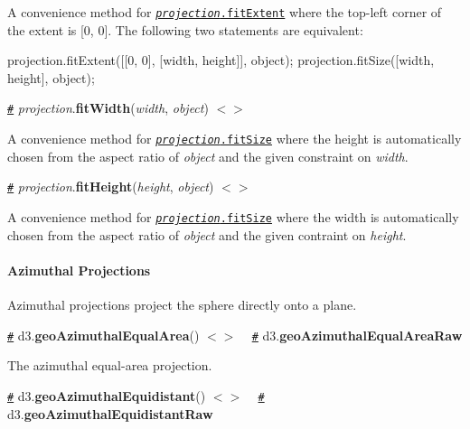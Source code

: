 A convenience method for \href{#projection_fitExtent}{\tt {\itshape projection}.fit\+Extent} where the top-\/left corner of the extent is \mbox{[}0, 0\mbox{]}. The following two statements are equivalent\+:


\begin{DoxyCode}
projection.fitExtent([[0, 0], [width, height]], object);
projection.fitSize([width, height], object);
\end{DoxyCode}


\href{#projection_fitWidth}{\tt \#} {\itshape projection}.{\bfseries fit\+Width}({\itshape width}, {\itshape object}) \href{https://github.com/d3/d3-geo/blob/master/src/projection/index.js#L105}{\tt $<$$>$}

A convenience method for \href{#projection_fitSize}{\tt {\itshape projection}.fit\+Size} where the height is automatically chosen from the aspect ratio of {\itshape object} and the given constraint on {\itshape width}.

\href{#projection_fitHeight}{\tt \#} {\itshape projection}.{\bfseries fit\+Height}({\itshape height}, {\itshape object}) \href{https://github.com/d3/d3-geo/blob/master/src/projection/index.js#L109}{\tt $<$$>$}

A convenience method for \href{#projection_fitSize}{\tt {\itshape projection}.fit\+Size} where the width is automatically chosen from the aspect ratio of {\itshape object} and the given contraint on {\itshape height}.

\paragraph*{Azimuthal Projections}

Azimuthal projections project the sphere directly onto a plane.

\href{#geoAzimuthalEqualArea}{\tt \#} d3.{\bfseries geo\+Azimuthal\+Equal\+Area}() \href{https://github.com/d3/d3-geo/blob/master/src/projection/azimuthalEqualArea.js}{\tt $<$$>$} ~\newline
\href{#geoAzimuthalEqualAreaRaw}{\tt \#} d3.{\bfseries geo\+Azimuthal\+Equal\+Area\+Raw}

\href{https://bl.ocks.org/mbostock/3757101}{\tt }

The azimuthal equal-\/area projection.

\href{#geoAzimuthalEquidistant}{\tt \#} d3.{\bfseries geo\+Azimuthal\+Equidistant}() \href{https://github.com/d3/d3-geo/blob/master/src/projection/azimuthalEquidistant.js}{\tt $<$$>$} ~\newline
\href{#geoAzimuthalEquidistantRaw}{\tt \#} d3.{\bfseries geo\+Azimuthal\+Equidistant\+Raw}

